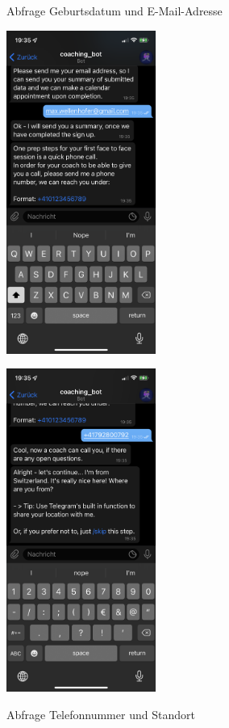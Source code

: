\begin{figure}
\begin{minipage}{.48\linewidth}
			\caption{Abfrage Geburtsdatum und E-Mail-Adresse}
		\end{minipage}\quad
		\begin{minipage}{.48\linewidth}
			\centering
			{\includegraphics[width=\linewidth,height=300pt,keepaspectratio]{images/Screenshots/telephone.PNG}}
		
			{\includegraphics[width=\linewidth,height=300pt,keepaspectratio]{images/Screenshots/location.PNG}}
		
			\caption{Abfrage Telefonnummer und Standort}
		\end{minipage}
	\end{figure}


